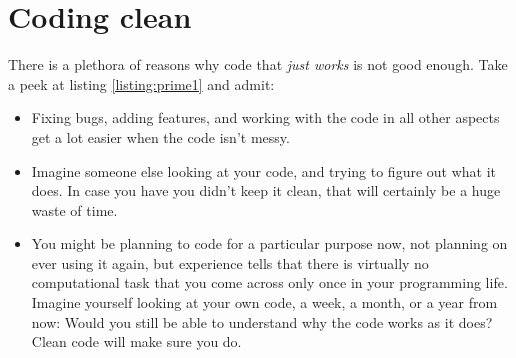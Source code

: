%
% 
% 
% 
%
\newpage
\section{Coding clean}

There is a plethora of reasons why code that \emph{just works\texttrademark} is not good enough. Take a peek at listing \ref{listing:prime1} and admit:

\begin{itemize}
\item Fixing bugs, adding features, and working with the code in all other aspects get a lot easier when the code isn't messy.
\item Imagine someone else looking at your code, and trying to figure out what it does. In case you have you didn't keep it clean, that will certainly be a huge waste of time.
\item You might be planning to code for a particular purpose now, not planning on ever using it again, but experience tells that there is virtually no computational task that you come across only once in your programming life. Imagine yourself looking at your own code, a week, a month, or a year from now: Would you still be able to understand why the code works as it does? Clean code will make sure you do.
\end{itemize}

